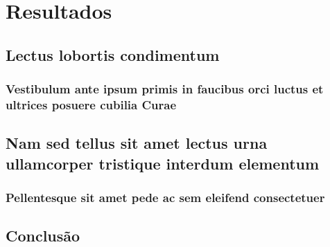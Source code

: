 \documentclass[
	12pt,				%
	openright,			%
	twoside,			%
	a4paper,			%
	english,			%
	french,				%
	spanish,			%
	brazil				%
	]{abntex2}
\begin{document}
\part{Resultados}

\chapter{Lectus lobortis condimentum}

\section{Vestibulum ante ipsum primis in faucibus orci luctus et ultrices
posuere cubilia Curae}

\lipsum[21-22]

\chapter{Nam sed tellus sit amet lectus urna ullamcorper tristique interdum
elementum}

\section{Pellentesque sit amet pede ac sem eleifend consectetuer}

\lipsum[24]


\chapter{Conclusão}

\lipsum[31-33]

\postextual


\end{document}
